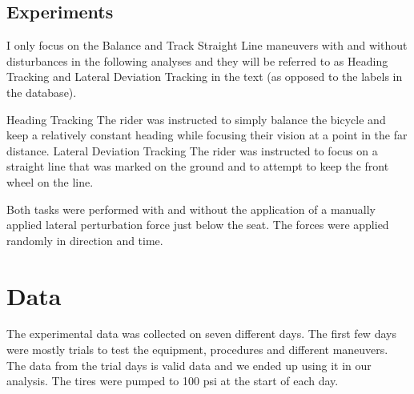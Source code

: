 \documentclass{article}
\begin{document}

\subsection{Experiments}
I only focus on the Balance and Track Straight Line maneuvers with and without
disturbances in the following analyses and they will be referred to as Heading
Tracking and Lateral Deviation Tracking in the text (as opposed to the labels
in the database).

Heading Tracking
    The rider was instructed to simply balance the bicycle and keep a
    relatively constant heading while focusing their vision at a point
    in the far distance.
Lateral Deviation Tracking
    The rider was instructed to focus on a straight line that was marked
    on the ground and to attempt to keep the front wheel on the line.

Both tasks were performed with and without the application of a manually
applied lateral perturbation force just below the seat. The forces were
applied randomly in direction and time.

\section{Data}

The experimental data was collected on seven different days. The first few days
were mostly trials to test the equipment, procedures and different maneuvers.
The data from the trial days is valid data and we ended up using it in our
analysis. The tires were pumped to 100 psi at the start of each day.
\end{document}
